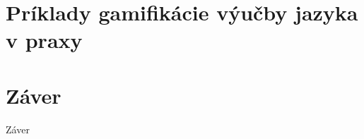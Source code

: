 \documentclass[10pt,twoside,slovak,a4paper]{article}
\begin{document}
\section{Príklady gamifikácie výučby jazyka v praxy} \label{prax}

\section{Záver} \label{zaver} %
Záver





\end{document}
